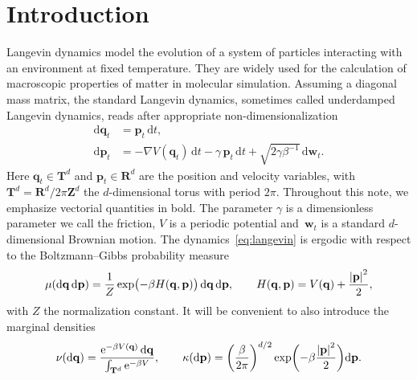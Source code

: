\documentclass[11pt,a4paper]{article}
\newcommand{\e}{\mathrm{e}}
\newcommand{\real}{\mathbf R}
\newcommand{\integer}{\mathbf Z}
\newcommand{\torus}{\mathbf T}
\newcommand{\grad}{\nabla}
\newcommand{\vect}[1]{\boldsymbol{\mathbf #1}}
\renewcommand{\d}{\mathrm d}
\theoremstyle{plain}
\numberwithin{equation}{section}
\begin{document}
\section{Introduction}%
Langevin dynamics model the evolution of a system of particles interacting with an environment at fixed temperature.
They are widely used for the calculation of macroscopic properties of matter in molecular simulation.
Assuming a diagonal mass matrix,
the standard Langevin dynamics, sometimes called underdamped Langevin dynamics,
reads after appropriate non-dimensionalization~\cite[Section 2.2.4]{MR2681239}
\begin{subequations}
\label{eq:langevin}
\begin{align}
    \label{eq:langevin_q}
    \d \vect q_t &= \vect p_t \, \d t, \\
    \label{eq:langevin_p}
    \d \vect p_t &= - \grad V(\vect q_t) \, \d t - \gamma \, \vect p_t \, \d t + \sqrt{2 \gamma \beta^{-1}} \, \d \vect w_t.
\end{align}
\end{subequations}
Here $\vect q_t \in \torus^d$ and $\vect p_t \in \real^d$ are the position and velocity variables,
with~$\torus^d = \real^d / 2\pi \integer^d$ the $d$-dimensional torus with period $2 \pi$.
Throughout this note, we emphasize vectorial quantities in bold.
The parameter $\gamma$ is a dimensionless parameter we call the friction,
$V$ is a periodic potential
and~$\vect w_t$ is a standard $d$-dimensional Brownian motion.
The dynamics~\eqref{eq:langevin} is ergodic with respect to the Boltzmann--Gibbs probability measure
\begin{equation}
    \label{eq:invariant_measure}
    \mu(\d \vect q \, \d \vect p) = \frac{1}{Z} \exp \bigl( - \beta H(\vect q, \vect p)  \bigr) \, \d \vect q \, \d \vect p,
    \qquad H(\vect q, \vect p) = V(\vect q) + \frac{\abs{\vect p}^2}{2},
\end{equation}
with $Z$ the normalization constant.
It will be convenient to also introduce the marginal densities
\begin{equation}
    \label{eq:definition_prob_measures}
    \nu(\d \vect q) = \frac{\e^{- \beta V(\vect q)} \, \d \vect q}{\int_{\torus^d}\e^{-\beta V}},
    \qquad \kappa(\d \vect p) = \left( \frac{\beta}{2 \pi} \right)^{d/2}\exp \biggl( - \beta \frac{\abs*{\vect p}^2}{2} \biggr) \d \vect p.
\end{equation}
\end{document}
